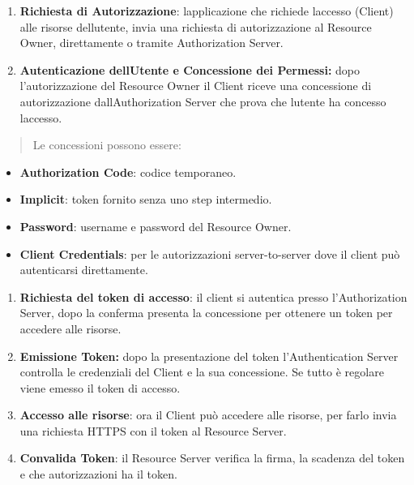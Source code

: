 \begin{enumerate}
\def\labelenumi{\arabic{enumi}.}
\item
  \textbf{Richiesta di Autorizzazione}: l\textquotesingle applicazione
  che richiede l\textquotesingle accesso (Client) alle risorse
  dell\textquotesingle utente, invia una richiesta di autorizzazione al
  Resource Owner, direttamente o tramite Authorization Server.
\item
  \textbf{Autenticazione dell\textquotesingle Utente e Concessione dei
  Permessi:} dopo l'autorizzazione del Resource Owner il Client riceve
  una concessione di autorizzazione dall\textquotesingle Authorization
  Server che prova che l\textquotesingle utente ha concesso
  l\textquotesingle accesso.
\end{enumerate}

\begin{quote}
Le concessioni possono essere:
\end{quote}

\begin{itemize}
\item
  \textbf{Authorization Code}: codice temporaneo.
\item
  \textbf{Implicit}: token fornito senza uno step intermedio.
\item
  \textbf{Password}: username e password del Resource Owner.
\item
  \textbf{Client Credentials}: per le autorizzazioni server-to-server
  dove il client può autenticarsi direttamente.
\end{itemize}

\begin{enumerate}
\def\labelenumi{\arabic{enumi}.}
\setcounter{enumi}{2}
\item
  \textbf{Richiesta del token di accesso}: il client si autentica presso
  l'Authorization Server, dopo la conferma presenta la concessione per
  ottenere un token per accedere alle risorse.
\item
  \textbf{Emissione Token:} dopo la presentazione del token
  l'Authentication Server controlla le credenziali del Client e la sua
  concessione. Se tutto è regolare viene emesso il token di accesso.
\item
  \textbf{Accesso alle risorse}: ora il Client può accedere alle
  risorse, per farlo invia una richiesta HTTPS con il token al Resource
  Server.
\item
  \textbf{Convalida Token}: il Resource Server verifica la firma, la
  scadenza del token e che autorizzazioni ha il token.
\end{enumerate}

